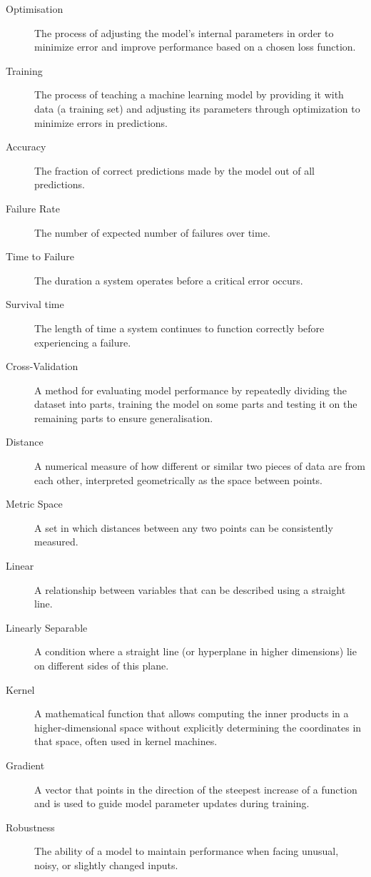 \begin{description}
    \item[Optimisation] The process of adjusting the model’s internal parameters in order to minimize error and improve performance based on a chosen loss function.
    \item[Training] The process of teaching a machine learning model by providing it with data (a training set) and adjusting its parameters through optimization to minimize errors in predictions.
    \item[Accuracy] The fraction of correct predictions made by the model out of all predictions.
    \item[Failure Rate] The number of expected number of failures over time.
    \item[Time to Failure] The duration a system operates before a critical error occurs.
    \item[Survival time] The length of time a system continues to function correctly before experiencing a failure.
    \item[Cross-Validation] A method for evaluating model performance by repeatedly dividing the dataset into parts, training the model on some parts and testing it on the remaining parts to ensure generalisation.
    \item[Distance] A numerical measure of how different or similar two pieces of data are from each other, interpreted geometrically as the space between points.
    \item[Metric Space] A set in which distances between any two points can be consistently measured.
    \item[Linear] A relationship between variables that can be described using a straight line.
    \item[Linearly Separable] A condition where a straight line (or hyperplane in higher dimensions) lie on different sides of this plane.
    \item[Kernel] A mathematical function that allows computing the inner products in a higher-dimensional space without explicitly determining the coordinates in that space, often used in kernel  machines.
    \item[Gradient] A vector that points in the direction of the steepest increase of a function and is used to guide model parameter updates during training.
    \item[Robustness] The ability of a model to maintain performance when facing unusual, noisy, or slightly changed inputs.

\end{description}

